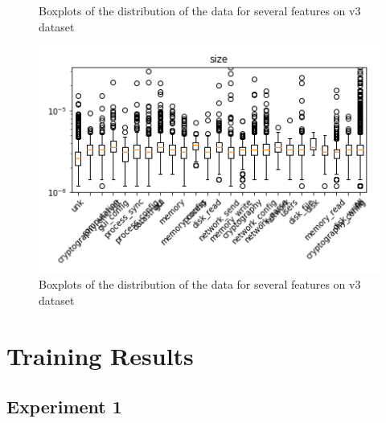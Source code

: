\begin{appendices}
\begin{figure}[H]
\caption{Boxplots of the distribution of the data for several features on v3 dataset}\label{fig:distribution_analysis7}
\end{figure}




\begin{figure}[H]



%
\centering
\includegraphics[width=0.9\linewidth]{img/boxplots/v3_unbalanced_size.png}
\endminipage


\caption{Boxplots of the distribution of the data for several features on v3 dataset}\label{fig:distribution_analysis8}
\end{figure}




\newpage
\section{Training Results}\label{annex:models}

\subsection{Experiment 1}


\end{appendices}
